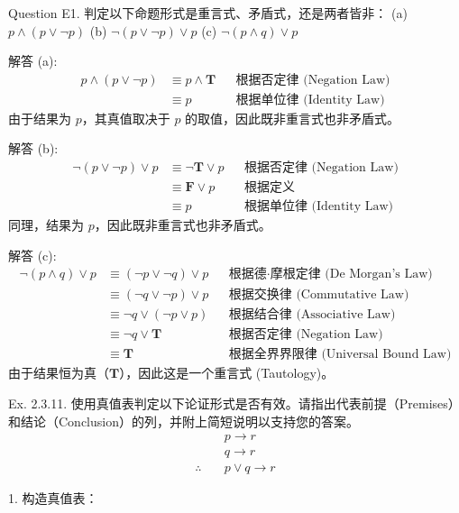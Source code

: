 \begin{questions}
\begin{solution}
\end{solution}

\question
Question E1. 判定以下命题形式是重言式、矛盾式，还是两者皆非：
(a) $p \wedge (p \lor \neg p)$
(b) $\neg(p \lor \neg p) \lor p$
(c) $\neg(p \wedge q) \lor p$

\begin{solution}
解答 (a):
\begin{align}
p \wedge (p \lor \neg p) &\equiv p \wedge \mathbf{T} && \text{根据否定律 (Negation Law)} \\
&\equiv p && \text{根据单位律 (Identity Law)}
\end{align}
由于结果为 $p$，其真值取决于 $p$ 的取值，因此既非重言式也非矛盾式。

解答 (b):
\begin{align}
\neg(p \lor \neg p) \lor p &\equiv \neg \mathbf{T} \lor p && \text{根据否定律 (Negation Law)} \\
&\equiv \mathbf{F} \lor p && \text{根据定义} \\
&\equiv p && \text{根据单位律 (Identity Law)}
\end{align}
同理，结果为 $p$，因此既非重言式也非矛盾式。

解答 (c):
\begin{align}
\neg(p \wedge q) \lor p &\equiv (\neg p \lor \neg q) \lor p && \text{根据德·摩根定律 (De Morgan's Law)} \\
&\equiv (\neg q \lor \neg p) \lor p && \text{根据交换律 (Commutative Law)} \\
&\equiv \neg q \lor (\neg p \lor p) && \text{根据结合律 (Associative Law)} \\
&\equiv \neg q \lor \mathbf{T} && \text{根据否定律 (Negation Law)} \\
&\equiv \mathbf{T} && \text{根据全界界限律 (Universal Bound Law)}
\end{align}
由于结果恒为真（$\mathbf{T}$），因此这是一个重言式 (Tautology)。
\end{solution}

\question
Ex. 2.3.11. 使用真值表判定以下论证形式是否有效。请指出代表前提（Premises）和结论（Conclusion）的列，并附上简短说明以支持您的答案。
\[
\begin{aligned}
& p \to r \\
& q \to r \\
\therefore \quad & p \lor q \to r
\end{aligned}
\]

\begin{solution}
1. 构造真值表：


\end{solution}
\end{questions}
